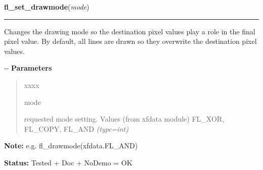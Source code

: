     \label{xformslib:flxbasic:fl_drawmode}

    \vspace{0.5ex}

\hspace{.8\funcindent}\begin{boxedminipage}{\funcwidth}

    \raggedright \textbf{fl\_set\_drawmode}(\textit{mode})

    \vspace{-1.5ex}

    \rule{\textwidth}{0.5\fboxrule}
\setlength{\parskip}{2ex}

Changes the drawing mode so the destination pixel values play a role
in the final pixel value. By default, all lines are drawn so they
overwrite the destination pixel values.

-{}-
\setlength{\parskip}{1ex}
      \textbf{Parameters}
      \vspace{-1ex}

      \begin{quote}
        \begin{Ventry}{xxxx}

          \item[mode]


requested mode setting. Values (from xfdata module) FL\_XOR, FL\_COPY,
FL\_AND
            {\it (type=int)}

        \end{Ventry}

      \end{quote}

\textbf{Note:} 
e.g. fl\_drawmode(xfdata.FL\_AND)


\textbf{Status:} 
Tested + Doc + NoDemo = OK


    \end{boxedminipage}

    \label{xformslib:flxbasic:fl_oval}

    \vspace{0.5ex}

